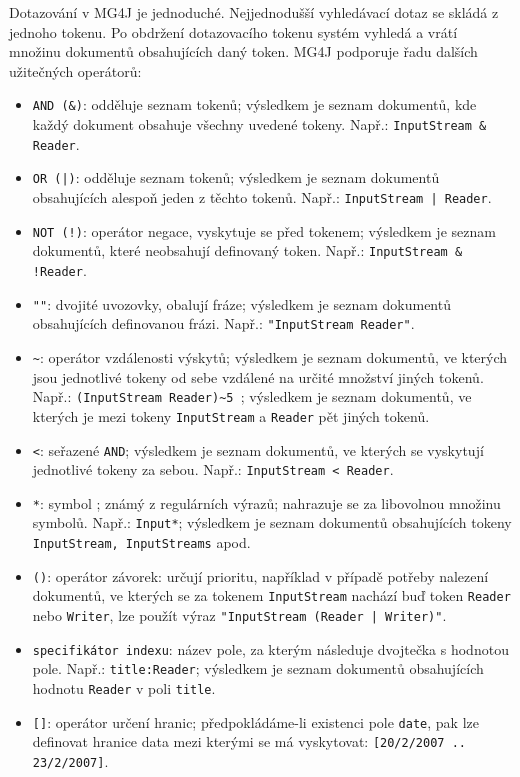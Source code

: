 Dotazování v MG4J je jednoduché. Nejjednodušší vyhledávací dotaz se skládá z jednoho tokenu. Po obdržení dotazovacího tokenu systém vyhledá a vrátí množinu dokumentů obsahujících daný token. MG4J podporuje řadu dalších užitečných operátorů:
\begin{itemize}
\item \texttt{AND\,(\&)}: odděluje seznam tokenů; výsledkem je seznam dokumentů, kde každý dokument obsahuje všechny uvedené tokeny. Např.: \texttt{InputStream \& Reader}.

\item \texttt{OR\,(|)}: odděluje seznam tokenů; výsledkem je seznam dokumentů obsahujících alespoň jeden z těchto tokenů.  Např.: \texttt{InputStream | Reader}.

\item \texttt{NOT\,(!)}: operátor negace, vyskytuje se před tokenem; výsledkem je seznam dokumentů, které neobsahují definovaný token. Např.: \texttt{InputStream \& !Reader}.

\item \texttt{""}: dvojité uvozovky, obalují fráze; výsledkem je seznam dokumentů obsahujících definovanou frázi. Např.: \texttt{"InputStream Reader"}.

\item \texttt{\textasciitilde}: operátor vzdálenosti výskytů; výsledkem je seznam dokumentů, ve kterých jsou jednotlivé tokeny od sebe vzdálené na určité množství jiných tokenů. Např.: \texttt{(InputStream Reader)\textasciitilde 5 }; výsledkem je seznam dokumentů, ve kterých je mezi tokeny \texttt{InputStream} a \texttt{Reader} pět jiných tokenů. 

\item \texttt{<}: seřazené \texttt{AND}; výsledkem je seznam dokumentů, ve kterých se vyskytují jednotlivé tokeny za sebou. Např.: \texttt{InputStream < Reader}.

\item \texttt{*}: symbol ; známý z regulárních výrazů; nahrazuje se za libovolnou množinu symbolů. Např.: \texttt{Input*}; výsledkem je seznam dokumentů obsahujících tokeny \texttt{InputStream, InputStreams} apod.

\item \texttt{()}: operátor závorek: určují prioritu, například v případě potřeby nalezení dokumentů, ve kterých se za tokenem \texttt{InputStream} nachází buď token \texttt{Reader} nebo \texttt{Writer}, lze použít výraz \texttt{"InputStream (Reader | Writer)"}. 

\item \texttt{specifikátor indexu}: název pole, za kterým následuje dvojtečka s hodnotou pole. Např.: \texttt{title:Reader}; výsledkem je seznam dokumentů obsahujících hodnotu \texttt{Reader} v poli \texttt{title}.

\item \texttt{[]}: operátor určení hranic; předpokládáme-li existenci pole \texttt{date}, pak lze definovat hranice data mezi kterými se má vyskytovat: \texttt{[20/2/2007 .. 23/2/2007]}. 
\end{itemize}

